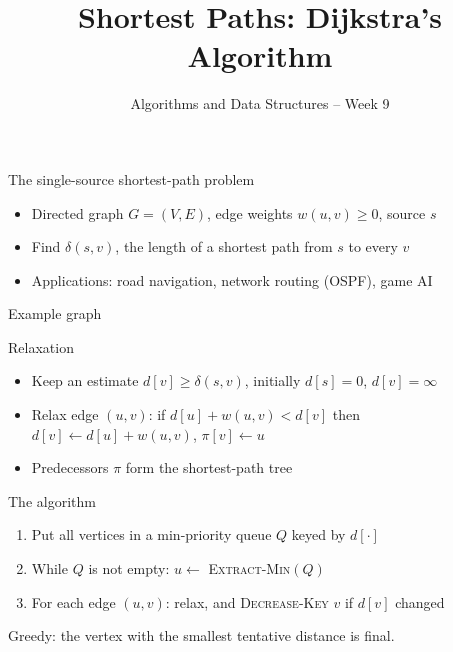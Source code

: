 \documentclass[aspectratio=169]{beamer}
\title{Shortest Paths: Dijkstra's Algorithm}
\subtitle{Algorithms and Data Structures -- Week 9}
\date{}
\begin{document}
\frame{\titlepage}

\begin{frame}{The single-source shortest-path problem}
\begin{itemize}
  \item Directed graph $G=(V,E)$, edge weights $w(u,v) \ge 0$, source $s$
  \item Find $\delta(s,v)$, the length of a shortest path from $s$ to every $v$
  \item Applications: road navigation, network routing (OSPF), game AI
\end{itemize}
\end{frame}

\begin{frame}{Example graph}
\centering
{}
\end{frame}

\begin{frame}{Relaxation}
\begin{itemize}
  \item Keep an estimate $d[v] \ge \delta(s,v)$, initially $d[s]=0$, $d[v]=\infty$
  \item Relax edge $(u,v)$: \quad if $d[u]+w(u,v) < d[v]$ then $d[v] \gets d[u]+w(u,v)$, $\pi[v]\gets u$
  \item Predecessors $\pi$ form the shortest-path tree
\end{itemize}
\end{frame}

\begin{frame}{The algorithm}
\begin{enumerate}
  \item Put all vertices in a min-priority queue $Q$ keyed by $d[\cdot]$
  \item While $Q$ is not empty: $u \gets$ \textsc{Extract-Min}$(Q)$
  \item For each edge $(u,v)$: relax, and \textsc{Decrease-Key} $v$ if $d[v]$ changed
\end{enumerate}
\medskip
Greedy: the vertex with the smallest tentative distance is final.
\end{frame}
\end{document}
